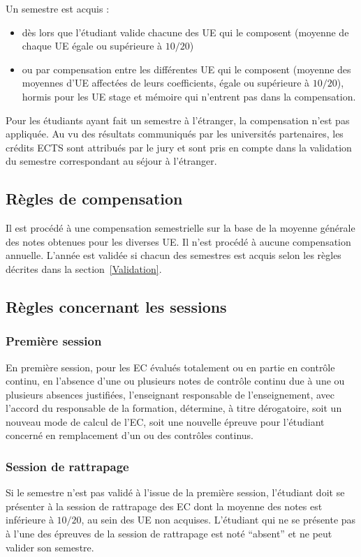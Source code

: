 \documentclass[a4paper,11pt]{article}
\begin{document}
Un semestre est acquis :
\begin{itemize}
	\item dès lors que l'étudiant valide chacune des UE qui le composent (moyenne de chaque UE égale ou supérieure à $10/20$)
	\item ou par compensation entre les différentes UE qui le composent (moyenne des moyennes d'UE affectées de leurs coefficients, égale ou supérieure à $10/20$), hormis pour les UE stage et mémoire qui n'entrent pas dans la compensation.
\end{itemize}

Pour les étudiants ayant fait un semestre à l'étranger, la compensation n'est pas appliquée. Au vu des résultats communiqués par les universités partenaires, les crédits ECTS sont attribués par le jury et sont pris en compte dans la validation du semestre correspondant au séjour à l'étranger.



\subsection{Règles de compensation}
Il est procédé à une compensation semestrielle sur la base de la moyenne générale des notes obtenues pour les diverses UE.
Il n'est procédé à aucune compensation annuelle. L'année est validée si chacun des semestres est acquis selon les règles décrites dans la section~\ref{Validation}.



\subsection{Règles concernant les sessions}
\subsubsection{Première session}
En première session, pour les EC évalués totalement ou en partie en contrôle continu, en l'absence d'une ou plusieurs notes de contrôle continu due à une ou plusieurs absences justifiées, l'enseignant responsable de l'enseignement, avec l'accord du responsable de la formation, détermine, à titre dérogatoire, soit un nouveau mode de calcul de l'EC, soit une nouvelle épreuve pour l'étudiant concerné en remplacement d'un ou des contrôles continus.

\subsubsection{Session de rattrapage}
Si le semestre n'est pas validé à l'issue de la première session, l'étudiant doit se présenter à la session de rattrapage des EC dont la moyenne des notes est inférieure à $10/20$, au sein des UE non acquises. L'étudiant qui ne se présente pas à l'une des épreuves de la session de rattrapage est noté ``absent'' et ne peut valider son semestre.
\end{document}
